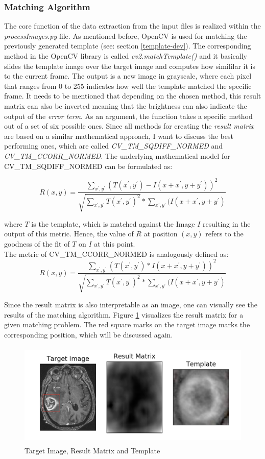 \documentclass[twoside,11pt]{article}
\begin{document}
\subsubsection{Matching Algorithm}
The core function of the data extraction from the input files is realized within the \textit{processImages.py} file. As mentioned before, OpenCV is used for matching the previously generated template (see: section \ref{template-dev}). The corresponding method in the OpenCV library is called \textit{cv2.matchTemplate()} and it basically slides the template image over the target image and computes how simililar it is to the current frame. The output is a new image in grayscale, where each pixel that ranges from 0 to 255 indicates how well the template matched the specific frame. It needs to be mentioned that depending on the chosen method, this result matrix can also be inverted meaning that the brightness can also indicate the output of the \textit{error term}.
As an argument, the function takes a specific method out of a set of six possible ones. Since all methods for creating the \textit{result matrix} are based on a similar mathematical approach, I want to discuss the best performing ones, which are called \textit{CV\_TM\_SQDIFF\_NORMED} and \textit{CV\_TM\_CCORR\_NORMED}. The underlying mathematical model for CV\_TM\_SQDIFF\_NORMED can be formulated as:

$$
R(x,y) = \frac{\sum_{x^{'},y^{'}}^{}(T(x^{'},y^{'})-I(x+x^{'},y+y^{'}))^2}{\sqrt{\sum_{x^{'},y^{'}}^{}T(x^{'},y^{'})^2}*\sum_{x^{'},y^{'}}^{}(I(x+x^{'},y+y^{'})}
$$

where $T$ is the template, which is matched against the Image $I$ resulting in the output of this metric. Hence, the value of $R$ at position $(x,y)$ refers to the goodness of the fit of $T$ on $I$ at this point. \\
The metric of CV\_TM\_CCORR\_NORMED is analogously defined as: 
$$
R(x,y) = \frac{\sum_{x^{'},y^{'}}^{}(T(x^{'},y^{'})*I(x+x^{'},y+y^{'}))^2}{\sqrt{\sum_{x^{'},y^{'}}^{}T(x^{'},y^{'})^2}*\sum_{x^{'},y^{'}}^{}(I(x+x^{'},y+y^{'})}
$$
\citep{opencvmethods}

Since the result matrix is also interpretable as an image, one can visually see the results of the matching algorithm. Figure \ref{fig:result-matrix} visualizes the result matrix for a given matching problem. The red square marks on the target image marks the corresponding position, which will be discussed again.

\begin{figure}
	\label{fig:result-matrix}
	\centering
	\includegraphics[height=5cm]{result-matrix}
	\caption{Target Image, Result Matrix and Template}
\end{figure}%
\end{document}
